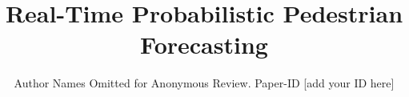 \documentclass[conference]{IEEEtran}
\begin{document}
\title{Real-Time Probabilistic Pedestrian Forecasting}

\author{Author Names Omitted for Anonymous Review. Paper-ID [add your ID here]}





% 


\maketitle
\end{document}

